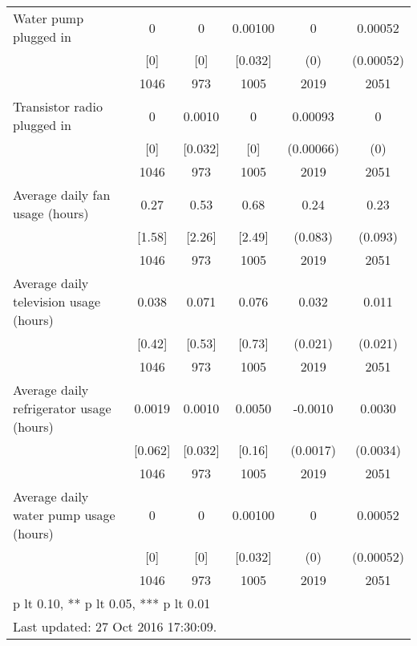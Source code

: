 \begin{table}[htbp]
\begin{tabular*}{0.9\hsize}{@{\hskip\tabcolsep\extracolsep\fill}l*{1}{ccccc}}
Water pump plugged in           &        0&        0&  0.00100&        0         &  0.00052         \\
                                &      [0]&      [0]&  [0.032]&      (0)         &(0.00052)         \\
                                &     1046&      973&     1005&     2019         &     2051         \\
Transistor radio plugged in     &        0&   0.0010&        0&  0.00093         &        0         \\
                                &      [0]&  [0.032]&      [0]&(0.00066)         &      (0)         \\
                                &     1046&      973&     1005&     2019         &     2051         \\
Average daily fan usage (hours) &     0.27&     0.53&     0.68&     0.24\sym{***}&     0.23\sym{**} \\
                                &   [1.58]&   [2.26]&   [2.49]&  (0.083)         &  (0.093)         \\
                                &     1046&      973&     1005&     2019         &     2051         \\
Average daily television usage (hours)&    0.038&    0.071&    0.076&    0.032         &    0.011         \\
                                &   [0.42]&   [0.53]&   [0.73]&  (0.021)         &  (0.021)         \\
                                &     1046&      973&     1005&     2019         &     2051         \\
Average daily refrigerator usage (hours)&   0.0019&   0.0010&   0.0050&  -0.0010         &   0.0030         \\
                                &  [0.062]&  [0.032]&   [0.16]& (0.0017)         & (0.0034)         \\
                                &     1046&      973&     1005&     2019         &     2051         \\
Average daily water pump usage (hours)&        0&        0&  0.00100&        0         &  0.00052         \\
                                &      [0]&      [0]&  [0.032]&      (0)         &(0.00052)         \\
                                &     1046&      973&     1005&     2019         &     2051         \\
\bottomrule
\multicolumn{6}{l}{\footnotesize * p lt 0.10, ** p lt 0.05, *** p lt 0.01}\\
\multicolumn{6}{l}{\footnotesize Last updated: 27 Oct 2016 17:30:09.}\\
\end{tabular*}
\end{table}
